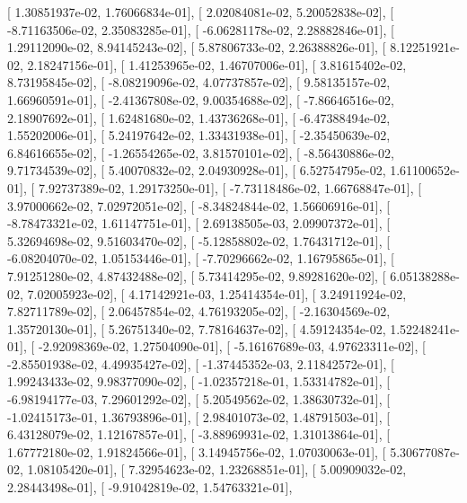 \documentclass{article}
\begin{document}
       [  1.30851937e-02,   1.76066834e-01],
       [  2.02084081e-02,   5.20052838e-02],
       [ -8.71163506e-02,   2.35083285e-01],
       [ -6.06281178e-02,   2.28882846e-01],
       [  1.29112090e-02,   8.94145243e-02],
       [  5.87806733e-02,   2.26388826e-01],
       [  8.12251921e-02,   2.18247156e-01],
       [  1.41253965e-02,   1.46707006e-01],
       [  3.81615402e-02,   8.73195845e-02],
       [ -8.08219096e-02,   4.07737857e-02],
       [  9.58135157e-02,   1.66960591e-01],
       [ -2.41367808e-02,   9.00354688e-02],
       [ -7.86646516e-02,   2.18907692e-01],
       [  1.62481680e-02,   1.43736268e-01],
       [ -6.47388494e-02,   1.55202006e-01],
       [  5.24197642e-02,   1.33431938e-01],
       [ -2.35450639e-02,   6.84616655e-02],
       [ -1.26554265e-02,   3.81570101e-02],
       [ -8.56430886e-02,   9.71734539e-02],
       [  5.40070832e-02,   2.04930928e-01],
       [  6.52754795e-02,   1.61100652e-01],
       [  7.92737389e-02,   1.29173250e-01],
       [ -7.73118486e-02,   1.66768847e-01],
       [  3.97000662e-02,   7.02972051e-02],
       [ -8.34824844e-02,   1.56606916e-01],
       [ -8.78473321e-02,   1.61147751e-01],
       [  2.69138505e-03,   2.09907372e-01],
       [  5.32694698e-02,   9.51603470e-02],
       [ -5.12858802e-02,   1.76431712e-01],
       [ -6.08204070e-02,   1.05153446e-01],
       [ -7.70296662e-02,   1.16795865e-01],
       [  7.91251280e-02,   4.87432488e-02],
       [  5.73414295e-02,   9.89281620e-02],
       [  6.05138288e-02,   7.02005923e-02],
       [  4.17142921e-03,   1.25414354e-01],
       [  3.24911924e-02,   7.82711789e-02],
       [  2.06457854e-02,   4.76193205e-02],
       [ -2.16304569e-02,   1.35720130e-01],
       [  5.26751340e-02,   7.78164637e-02],
       [  4.59124354e-02,   1.52248241e-01],
       [ -2.92098369e-02,   1.27504090e-01],
       [ -5.16167689e-03,   4.97623311e-02],
       [ -2.85501938e-02,   4.49935427e-02],
       [ -1.37445352e-03,   2.11842572e-01],
       [  1.99243433e-02,   9.98377090e-02],
       [ -1.02357218e-01,   1.53314782e-01],
       [ -6.98194177e-03,   7.29601292e-02],
       [  5.20549562e-02,   1.38630732e-01],
       [ -1.02415173e-01,   1.36793896e-01],
       [  2.98401073e-02,   1.48791503e-01],
       [  6.43128079e-02,   1.12167857e-01],
       [ -3.88969931e-02,   1.31013864e-01],
       [  1.67772180e-02,   1.91824566e-01],
       [  3.14945756e-02,   1.07030063e-01],
       [  5.30677087e-02,   1.08105420e-01],
       [  7.32954623e-02,   1.23268851e-01],
       [  5.00909032e-02,   2.28443498e-01],
       [ -9.91042819e-02,   1.54763321e-01],
\end{document}
